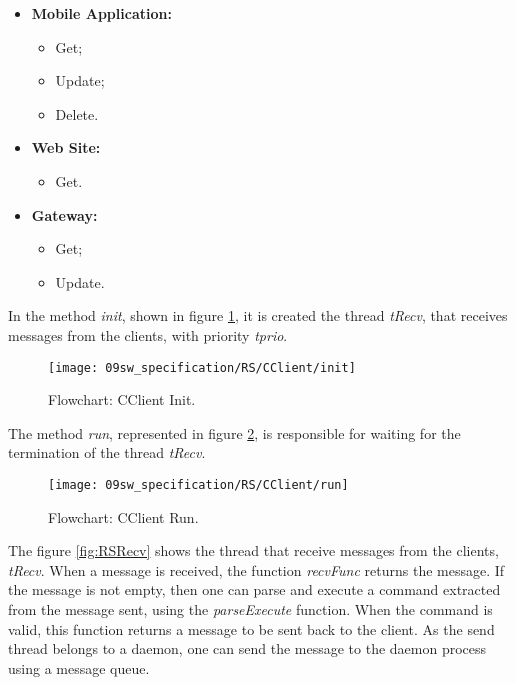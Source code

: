 \begin{itemize}
	\item \textbf{Mobile Application:} 
		\begin{itemize}
			\item Get;
			\item Update;
			\item Delete.
		\end{itemize}
	
	\item \textbf{Web Site:}
		\begin{itemize}
			\item Get.			
		\end{itemize}
	
	\item \textbf{Gateway:}
		\begin{itemize}
			\item Get;
			\item Update.
		\end{itemize}

\end{itemize}

In the method \textit{init}, shown in figure \ref{fig:clientInit}, it is created the thread \textit{tRecv}, that receives messages from the clients, with priority \textit{tprio}.

\begin{figure}[H]
	\centering
	\texttt{[image: 09sw\_specification/RS/CClient/init]}
	\caption{Flowchart: CClient Init.}
	\label{fig:clientInit}
\end{figure}

The method \textit{run}, represented in figure \ref{fig:clientRun}, is responsible for waiting for the termination of the thread \textit{tRecv}.

\begin{figure}[H]
	\centering
	\texttt{[image: 09sw\_specification/RS/CClient/run]}
	\caption{Flowchart: CClient Run.}
	\label{fig:clientRun}
\end{figure}

The figure \ref{fig:RSRecv} shows the thread that receive messages from the clients, \textit{tRecv}. When a message is received, the function \textit{recvFunc} returns the message. If the message is not empty, then one can parse and execute a command extracted from the message sent, using the \textit{parseExecute} function. When the command is valid, this function returns a message to be sent back to the client. As the send thread belongs to a daemon, one can send the message to the daemon process using a message queue.

